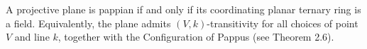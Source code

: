 A projective plane is pappian if and only if its coordinating planar ternary ring is a field. Equivalently, the plane admits $(V,k)$-transitivity for all choices of point $V$ and line $k$, together with the Configuration of Pappus (see Theorem 2.6).
